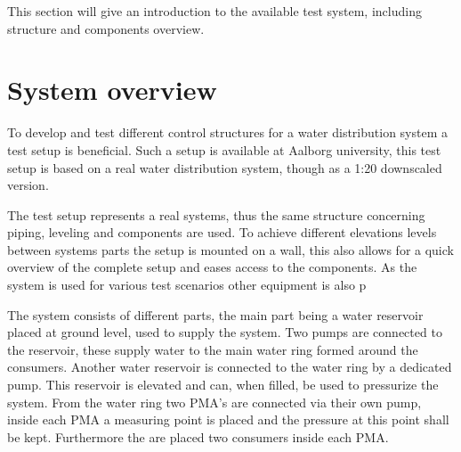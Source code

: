 This section will give an introduction to the available test system, including structure and components overview.  

\section{System overview}
\label{system_overview}
To develop and test different control structures for a water distribution system a test setup is beneficial.
Such a setup is available at Aalborg university, this test setup is based on a real water distribution system, though as a 1:20 downscaled version.

The test setup represents a real systems, thus the same structure concerning piping, leveling and components are used. To achieve different elevations levels between systems parts the setup is mounted on a wall, this also allows for a quick overview of the complete setup and eases access to the components. As the system is used for various test scenarios other equipment is also p

The system consists of different parts, the main part being a water reservoir placed at ground level, used to supply the system. Two pumps are connected to the reservoir, these supply water to the main water ring formed around the consumers. 
Another water reservoir is connected to the water ring by a dedicated pump. This reservoir is elevated and can, when filled, be used to pressurize the system. 
From the water ring two PMA's are connected via their own pump, inside each PMA a measuring point is placed and the pressure at this point shall be kept. Furthermore the are placed two consumers inside each PMA.         

